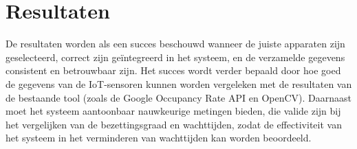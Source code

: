 


\section{Resultaten}
De resultaten worden als een succes beschouwd wanneer de juiste apparaten zijn geselecteerd, correct zijn geïntegreerd in het systeem, en de verzamelde gegevens consistent en betrouwbaar zijn. Het succes wordt verder bepaald door hoe goed de gegevens van de IoT-sensoren kunnen worden vergeleken met de resultaten van de bestaande tool (zoals de Google Occupancy Rate API en OpenCV). Daarnaast moet het systeem aantoonbaar nauwkeurige metingen bieden, die valide zijn bij het vergelijken van de bezettingsgraad en wachttijden, zodat de effectiviteit van het systeem in het verminderen van wachttijden kan worden beoordeeld.

